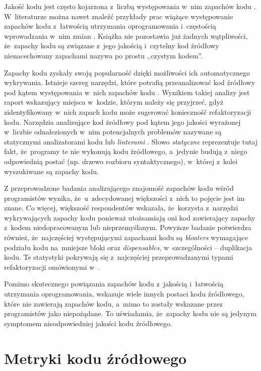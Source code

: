 \documentclass[twoside]{praca}
\begin{document}
Jakość kodu jest często kojarzona z~liczbą występowania w~nim zapachów kodu \cite{van2002java}. W~literaturze można nawet znaleźć przykłady prac wiążące występowanie zapachów kodu z~łatwością utrzymania oprogramowania i~częstością wprowadzania w~nim zmian \cite{khomh2009exploratory, yamashita2012code}. Książka \cite{martin2009clean} nie pozostawia już żadnych wątpliwości, że~zapachy kodu są związane z~jego jakością i~czytelny kod źródłowy nienacechowany zapachami nazywa po prostu ,,czystym kodem''.

Zapachy kodu zyskały swoją popularność dzięki możliwości ich automatycznego wykrywania. Istnieje szereg narzędzi, które potrafią przeanalizować kod źródłowy pod kątem występowania w~nich zapachów kodu \cite{fontana2011experience}. Wynikiem takiej analizy jest raport wskazujący miejsca w~kodzie, którym należy się przyjrzeć, gdyż zidentyfikowany w~nich zapach kodu może sugerować konieczność refaktoryzacji kodu. Narzędzia analizujące kod źródłowy pod kątem jego jakości wyrażonej w~liczbie odnalezionych w~nim potencjalnych problemów nazywane są statycznymi analizatorami kodu lub \textit{linterami} \cite{louridas2006static, nielson2015principles}. Słowo \textit{statyczne} reprezentuje tutaj fakt, że~programy te nie wykonują kodu źródłowego, a~jedynie budują z~niego odpowiednią postać (np. drzewo rozbioru syntaktycznego), w~której z~kolei wyszukiwane są zapachy kodu.

Z przeprowadzone badania \cite{yamashita2013developers} analizującego znajomość zapachów kodu wśród programistów wynika, że~u~zdecydowanej większości z~nich to pojęcie jest im znane. Co więcej, większość respondentów wskazała, że~korzysta z~narzędzi wykrywających zapachy kodu ponieważ utożsamiają oni kod zawierający zapachy z~kodem niedopracowanym lub nieprzemyślanym. Powyższe badanie potwierdza również, że~najczęściej występującymi zapachami kodu są \textit{bloaters} wymagające podziału kodu na~mniejsze bloki oraz \textit{dispensables}, w~szczególności -- duplikacja kodu. Te statystyki pokrywają się z~najczęściej przeprowadzanymi typami refaktoryzacji omówionymi w~\cite{silva2016we}.

Pomimo skutecznego powiązania zapachów kodu z~jakością i~łatwością utrzymania oprogramowania, \cite{yamashita2012code} wskazuje wiele innych postaci kodu źródłowego, które nie zawierają zapachów kodu, a~mimo to zostały wskazane przez programistów jako niepożądane. To uświadamia, że~zapachy kodu nie są jedynym symptomem nieodpowiedniej jakości kodu źródłowego.

\section{Metryki kodu źródłowego}
\label{sec:related:metrics}
\end{document}
